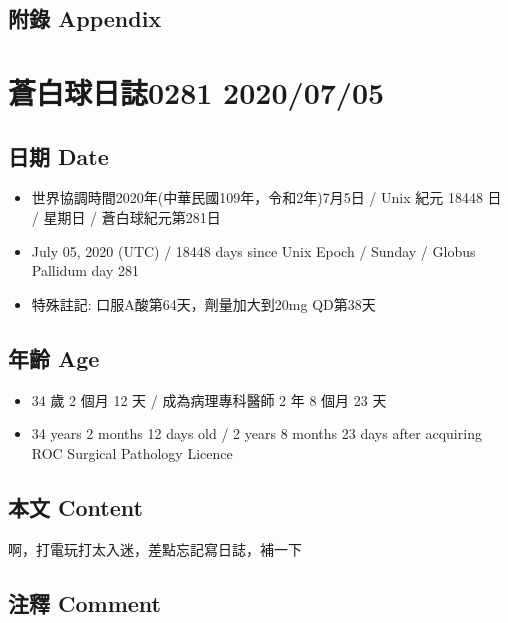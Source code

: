 \documentclass[a5paper, 11pt
]{book}
\providecommand{\tightlist}{%
  \setlength{\itemsep}{0pt}\setlength{\parskip}{0pt}}
\begin{document}
\hypertarget{ux9644ux9304-appendix-33}{%
\subsection{附錄 Appendix}\label{ux9644ux9304-appendix-33}}

\hypertarget{ux84bcux767dux7403ux65e5ux8a8c0281-20200705}{%
\section{蒼白球日誌0281
2020/07/05}\label{ux84bcux767dux7403ux65e5ux8a8c0281-20200705}}

\hypertarget{ux65e5ux671f-date-34}{%
\subsection{日期 Date}\label{ux65e5ux671f-date-34}}

\begin{itemize}
\tightlist
\item
  世界協調時間2020年(中華民國109年，令和2年)7月5日 / Unix 紀元 18448 日
  / 星期日 / 蒼白球紀元第281日
\item
  July 05, 2020 (UTC) / 18448 days since Unix Epoch / Sunday / Globus
  Pallidum day 281
\item
  特殊註記: 口服A酸第64天，劑量加大到20mg QD第38天
\end{itemize}

\hypertarget{ux5e74ux9f61-age-34}{%
\subsection{年齡 Age}\label{ux5e74ux9f61-age-34}}

\begin{itemize}
\tightlist
\item
  34 歲 2 個月 12 天 / 成為病理專科醫師 2 年 8 個月 23 天
\item
  34 years 2 months 12 days old / 2 years 8 months 23 days after
  acquiring ROC Surgical Pathology Licence
\end{itemize}

\hypertarget{ux672cux6587-content-34}{%
\subsection{本文 Content}\label{ux672cux6587-content-34}}

啊，打電玩打太入迷，差點忘記寫日誌，補一下

\hypertarget{ux6ce8ux91cb-comment-34}{%
\subsection{注釋 Comment}\label{ux6ce8ux91cb-comment-34}}
\end{document}
